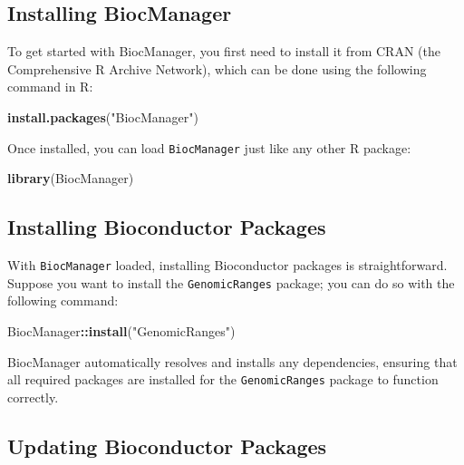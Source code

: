 \documentclass[
]{book}
\newenvironment{Shaded}{\begin{snugshade}}{\end{snugshade}}
\newcommand{\FunctionTok}[1]{\textcolor[rgb]{0.13,0.29,0.53}{\textbf{#1}}}
\newcommand{\NormalTok}[1]{#1}
\newcommand{\SpecialCharTok}[1]{\textcolor[rgb]{0.81,0.36,0.00}{\textbf{#1}}}
\newcommand{\StringTok}[1]{\textcolor[rgb]{0.31,0.60,0.02}{#1}}
\begin{document}
\hypertarget{installing-biocmanager}{%
\subsection{Installing BiocManager}\label{installing-biocmanager}}

To get started with BiocManager, you first need to install it from CRAN (the Comprehensive R Archive Network), which can be done using the following command in R:

\begin{Shaded}
\begin{Highlighting}[]
\FunctionTok{install.packages}\NormalTok{(}\StringTok{"BiocManager"}\NormalTok{)}
\end{Highlighting}
\end{Shaded}

Once installed, you can load \texttt{BiocManager} just like any other R package:

\begin{Shaded}
\begin{Highlighting}[]
\FunctionTok{library}\NormalTok{(BiocManager)}
\end{Highlighting}
\end{Shaded}

\hypertarget{installing-bioconductor-packages}{%
\subsection{Installing Bioconductor Packages}\label{installing-bioconductor-packages}}

With \texttt{BiocManager} loaded, installing Bioconductor packages is straightforward. Suppose you want to install the \texttt{GenomicRanges} package; you can do so with the following command:

\begin{Shaded}
\begin{Highlighting}[]
\NormalTok{BiocManager}\SpecialCharTok{::}\FunctionTok{install}\NormalTok{(}\StringTok{"GenomicRanges"}\NormalTok{)}
\end{Highlighting}
\end{Shaded}

BiocManager automatically resolves and installs any dependencies, ensuring that all required packages are installed for the \texttt{GenomicRanges} package to function correctly.

\hypertarget{updating-bioconductor-packages}{%
\subsection{Updating Bioconductor Packages}\label{updating-bioconductor-packages}}
\end{document}
